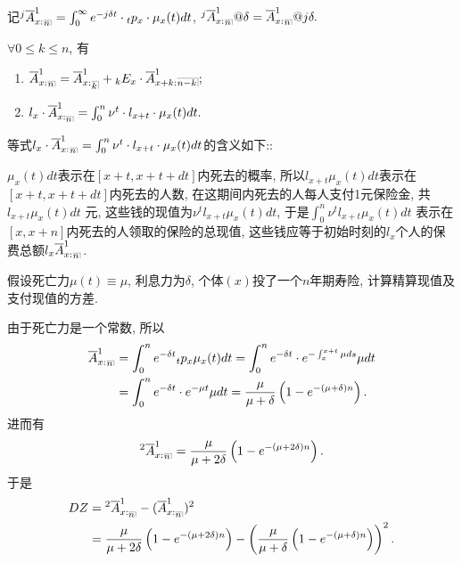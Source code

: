 \documentclass[lang=cn,10pt]{elegantbook}
\makeatletter
\DeclareRobustCommand{\annu}[1]{_{%
    \def\arraystretch{0}%
    \setlength\arraycolsep{1pt}%
    \setlength\arrayrulewidth{.2pt}%
    \begin{array}[b]{@{}c|}\hline
        \\[\arraycolsep]%
        \scriptstyle #1%
    \end{array}%
}}
\makeatother
\begin{document}
\begin{remark}
	记$^j\overline{A}_{x:}^1{}_{\annu{n}}=\int_0^{\infty}{e^{-j\delta t}\cdot {}_tp_x\cdot \mu_{x}(t)dt}$, $^j\overline{A}_{x:}^1{}_{\annu{n}}@\delta=\overline{A}_{x:}^1{}_{\annu{n}}@j\delta.$
\end{remark}

\begin{corollary}[精算现值的性质]
	$\forall 0\leqslant k\leqslant n$, 有
	\begin{enumerate}
		\item $\overline{A}_{x:}^1{}_{{}\annu{n}}=\overline{A}_{x:}^1{}_{\annu k}+{}_kE_x\cdot\overline{A}_{x+k:}^1{}\annu{n-k};$
		\item $l_x\cdot\overline{A}_{x:\annu{n}}^1=\int_0^{n}{\nu^{t}\cdot l_{x+t}\cdot \mu_{x}(t)dt}.$
	\end{enumerate}
\end{corollary}

\begin{remark}
	等式$l_x\cdot\overline{A}_{x:}^1{}_{\annu{n}}=\int_0^{n}{\nu^{t}\cdot l_{x+t}\cdot \mu_{x}(t)dt}$的含义如下::

    $\mu_x(t)dt$表示在$[x+t,x+t+dt]$内死去的概率, 所以$l_{x+t}\mu_x(t)dt$表示在$[x+t,x+t+dt]$内死去的人数, 在这期间内死去的人每人支付1元保险金, 共$l_{x+t}\mu_x(t)dt$ 元, 这些钱的现值为$\nu^t l_{x+t}\mu_x(t)dt$, 于是$\int_0^n{\nu^t l_{x+t}\mu_x(t)dt}$ 表示在$[x,x+n]$内死去的人领取的保险的总现值, 这些钱应等于初始时刻的$l_x$个人的保费总额$l_x\overline{A}_{x:}^1{}_{\annu{n}}$.
\end{remark}

\begin{example}
    假设死亡力$\mu(t) \equiv \mu $, 利息力为$\delta$, 个体$(x)$投了一个$n$年期寿险, 计算精算现值及支付现值的方差.
\end{example}

\begin{solution}
	由于死亡力是一个常数, 所以
\begin{align*}
    \overline{A}_{x:}^1{}_{\annu{n}} & = \int_0^n{e^{-\delta t}{}_tp_x\mu_x(t)dt}= \int_0^n{e^{-\delta t}\cdot e^{-\int_{x}^{x+t} \mu ds}\mu dt} \\
	     & = \int_0^n{e^{-\delta t}\cdot e^{-\mu t}\mu dt} = \frac{\mu}{\mu + \delta} \left(1 - e^{-(\mu + \delta)n} \right).
\end{align*}
进而有
\begin{align*}
    ^2\overline{A}_{x:}^1{}_{\annu{n}}= \frac{\mu}{\mu + 2\delta} \left(1 - e^{-(\mu + 2\delta)n} \right).
\end{align*}
于是
\begin{align*}
    DZ& = {}^2\overline{A}_{x:\annu{n}}^1 - (\overline{A}_{x:\annu{n}}^1)^2\\
     &= \frac{\mu}{\mu + 2\delta} \left(1 - e^{-(\mu + 2\delta)n} \right) - \left(\frac{\mu}{\mu + \delta} \left(1 - e^{-(\mu + \delta)n} \right)\right)^2.
\end{align*}
\end{solution}
\end{document}

